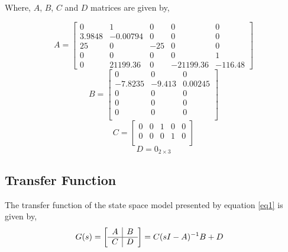 \documentclass[12pt]{article}
\begin{document}
	
	\noindent Where, $A$, $B$, $C$ and $D$ matrices are given by,
	
	\begin{equation}
	A = \begin{bmatrix}
	0 & 1 & 0 & 0 & 0\\
	3.9848 & -0.00794 & 0 & 0 & 0\\
	25 & 0 & -25 & 0 & 0\\
	0 & 0 & 0 & 0 & 1\\
	0 & 21199.36 & 0 & -21199.36 & -116.48 %
	\end{bmatrix}
	\end{equation}
	\begin{equation}
	B = \begin{bmatrix}
	0 & 0 & 0 \\
	-7.8235 & -9.413 & 0.00245 \\
	0 & 0 & 0 \\
	0 & 0 & 0 \\
	0 & 0 & 0 \\
	\end{bmatrix}
	\end{equation}
	\begin{equation}
	C = \begin{bmatrix}
	0 & 0 & 1 & 0 &  0\\
	0 & 0 & 0 & 1 & 0 \\
	\end{bmatrix}
	\end{equation}
	\begin{equation}
	D = 0_{2 \times 3}
	\end{equation}
	
	\subsection{Transfer Function}
	The transfer function of the state space model presented by equation \ref{eq1} is given by,
	\begin{equation}
	\begin{split}
	G(s)
	&= \left[
	\begin{array}{c | c}
	A  & B \\ \hline
	C & D
	\end{array}\right] = C(sI - A)^{-1}B + D
	\end{split}
	\end{equation}
	
\end{document}
